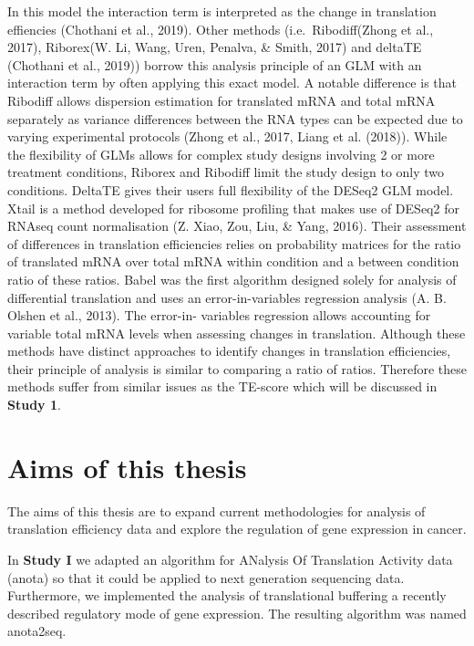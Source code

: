 \documentclass[12pt,openany]{book}
\begin{document}
In this model the interaction term is interpreted as the change in
translation effiencies (Chothani et al., 2019). Other methods
(i.e.~Ribodiff(Zhong et al., 2017), Riborex(W. Li, Wang, Uren, Penalva,
\& Smith, 2017) and deltaTE (Chothani et al., 2019)) borrow this
analysis principle of an GLM with an interaction term by often applying
this exact model. A notable difference is that Ribodiff allows
dispersion estimation for translated mRNA and total mRNA separately as
variance differences between the RNA types can be expected due to
varying experimental protocols (Zhong et al., 2017, Liang et al.
(2018)). While the flexibility of GLMs allows for complex study designs
involving 2 or more treatment conditions, Riborex and Ribodiff limit the
study design to only two conditions. DeltaTE gives their users full
flexibility of the DESeq2 GLM model. Xtail is a method developed for
ribosome profiling that makes use of DESeq2 for RNAseq count
normalisation (Z. Xiao, Zou, Liu, \& Yang, 2016). Their assessment of
differences in translation efficiencies relies on probability matrices
for the ratio of translated mRNA over total mRNA within condition and a
between condition ratio of these ratios. Babel was the first algorithm
designed solely for analysis of differential translation and uses an
error-in-variables regression analysis (A. B. Olshen et al., 2013). The
error-in- variables regression allows accounting for variable total mRNA
levels when assessing changes in translation. Although these methods
have distinct approaches to identify changes in translation
efficiencies, their principle of analysis is similar to comparing a
ratio of ratios. Therefore these methods suffer from similar issues as
the TE-score which will be discussed in \textbf{Study 1}.

\chapter{Aims of this thesis}

The aims of this thesis are to expand current methodologies for analysis
of translation efficiency data and explore the regulation of gene
expression in cancer.

In \textbf{Study I} we adapted an algorithm for ANalysis Of Translation
Activity data (anota) so that it could be applied to next generation
sequencing data. Furthermore, we implemented the analysis of
translational buffering a recently described regulatory mode of gene
expression. The resulting algorithm was named anota2seq.
\end{document}
